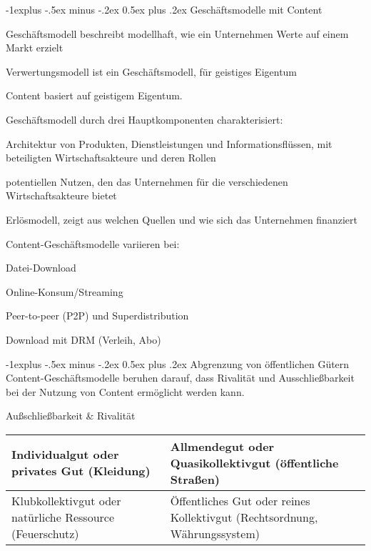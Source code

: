 \documentclass[a4paper, 8pt]{article}
\makeatletter
\renewcommand{\subsection}{\@startsection{subsection}{2}{0mm}%
                                {-1explus -.5ex minus -.2ex}%
                                {0.5ex plus .2ex}%
                                {\normalfont\normalsize\bfseries}}
\makeatother
\begin{document}
\begin{multicols*}{2}
  \subsection{Geschäftsmodelle mit Content}
  \begin{itemize*}
    \item Geschäftsmodell beschreibt modellhaft, wie ein Unternehmen Werte auf einem Markt erzielt
    \item Verwertungsmodell ist ein Geschäftsmodell, für geistiges Eigentum
    \item Content basiert auf geistigem Eigentum.
    \item Geschäftsmodell durch drei Hauptkomponenten charakterisiert:
    \begin{itemize*}
      \item Architektur von Produkten, Dienstleistungen und Informationsflüssen, mit beteiligten Wirtschaftsakteure und deren Rollen
      \item potentiellen Nutzen, den das Unternehmen für die verschiedenen Wirtschaftsakteure bietet
      \item Erlösmodell, zeigt aus welchen Quellen und wie sich das Unternehmen finanziert
    \end{itemize*}
    \item Content-Geschäftsmodelle variieren bei:
    \begin{itemize*}
      \item Datei-Download
      \item Online-Konsum/Streaming
      \item Peer-to-peer (P2P) und Superdistribution
      \item Download mit DRM (Verleih, Abo)
    \end{itemize*}
  \end{itemize*}

  \subsection{Abgrenzung von öffentlichen Gütern}
  Content-Geschäftsmodelle beruhen darauf, dass Rivalität und Ausschließbarkeit bei der Nutzung von Content ermöglicht werden kann.

  Außschließbarkeit \& Rivalität
  \begin{tabular}{p{4cm} | p{4cm} }\hline
    Individualgut oder privates Gut (Kleidung)               & Allmendegut oder Quasikollektivgut (öffentliche Straßen)                  \\\hline
    Klubkollektivgut oder natürliche Ressource (Feuerschutz) & Öffentliches Gut oder reines Kollektivgut (Rechtsordnung, Währungssystem) \\\hline
  \end{tabular}


\end{multicols*}
\end{document}
